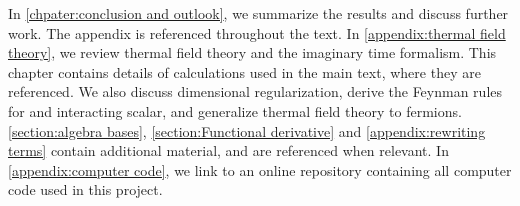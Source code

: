 In \autoref{chpater:conclusion and outlook}, we summarize the results and discuss further work.
The appendix is referenced throughout the text.
In \autoref{appendix:thermal field theory}, we review thermal field theory and the imaginary time formalism.
This chapter contains details of calculations used in the main text, where they are referenced.
We also discuss dimensional regularization, derive the Feynman rules for and interacting scalar, and generalize thermal field theory to fermions.
\autoref{section:algebra bases}, \autoref{section:Functional derivative} and \autoref{appendix:rewriting terms} contain additional material, and are referenced when relevant.
In \autoref{appendix:computer code}, we link to an online repository containing all computer code used in this project.
